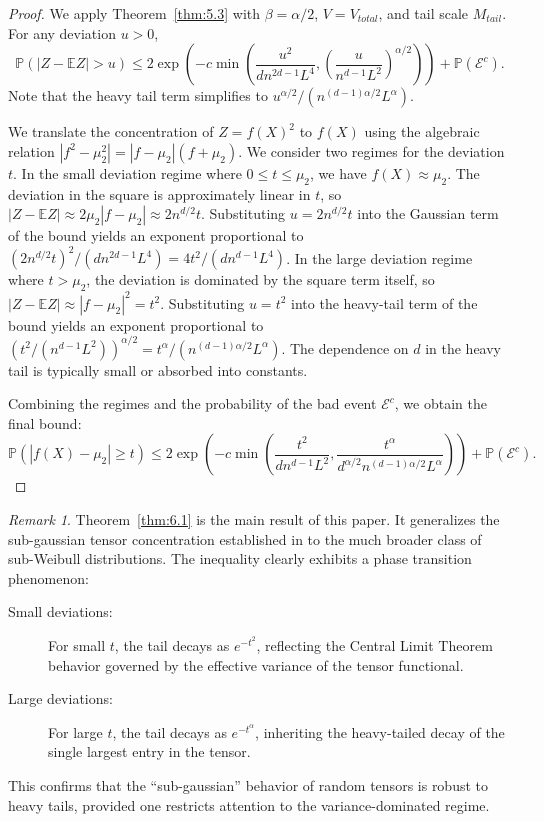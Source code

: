 \documentclass[11pt]{amsart}
\theoremstyle{definition}
\theoremstyle{remark}
\newtheorem*{remark}{Remark}
\begin{document}
\begin{proof}
We apply Theorem~\ref{thm:5.3} with $\beta = \alpha/2$, $V = V_{total}$, and tail scale $M_{tail}$. For any deviation $u > 0$,
\begin{equation}
\mathbb{P}(|Z - \mathbb{E}Z| > u) \le 2 \exp\left( -c \min\left( \frac{u^2}{d n^{2d-1} L^4}, \left( \frac{u}{n^{d-1} L^2} \right)^{\alpha/2} \right) \right) + \mathbb{P}(\mathcal{E}^c).
\end{equation}
Note that the heavy tail term simplifies to $u^{\alpha/2} / (n^{(d-1)\alpha/2} L^\alpha)$.

We translate the concentration of $Z = f(X)^2$ to $f(X)$ using the algebraic relation $|f^2 - \mu_2^2| = |f - \mu_2|(f + \mu_2)$. We consider two regimes for the deviation $t$. In the small deviation regime where $0 \le t \le \mu_2$, we have $f(X) \approx \mu_2$. The deviation in the square is approximately linear in $t$, so $|Z - \mathbb{E}Z| \approx 2\mu_2 |f - \mu_2| \approx 2 n^{d/2} t$. Substituting $u = 2 n^{d/2} t$ into the Gaussian term of the bound yields an exponent proportional to $(2 n^{d/2} t)^2 / (d n^{2d-1} L^4) = 4 t^2 / (d n^{d-1} L^4)$. In the large deviation regime where $t > \mu_2$, the deviation is dominated by the square term itself, so $|Z - \mathbb{E}Z| \approx |f - \mu_2|^2 = t^2$. Substituting $u = t^2$ into the heavy-tail term of the bound yields an exponent proportional to $(t^2 / (n^{d-1} L^2))^{\alpha/2} = t^\alpha / (n^{(d-1)\alpha/2} L^\alpha)$. The dependence on $d$ in the heavy tail is typically small or absorbed into constants.

Combining the regimes and the probability of the bad event $\mathcal{E}^c$, we obtain the final bound:
\begin{equation}
\mathbb{P}\left( |f(X) - \mu_2| \ge t \right) \le 2 \exp\left( -c \min\left( \frac{t^2}{d n^{d-1} L^2}, \frac{t^\alpha}{d^{\alpha/2} n^{(d-1)\alpha/2} L^\alpha} \right) \right) + \mathbb{P}(\mathcal{E}^c).
\end{equation}
\end{proof}

\begin{remark}
Theorem~\ref{thm:6.1} is the main result of this paper. It generalizes the sub-gaussian tensor concentration established in \cite{Vershynin2020} to the much broader class of sub-Weibull distributions. The inequality clearly exhibits a phase transition phenomenon:
\begin{description}
    \item[Small deviations:] For small $t$, the tail decays as $e^{-t^2}$, reflecting the Central Limit Theorem behavior governed by the effective variance of the tensor functional.
    \item[Large deviations:] For large $t$, the tail decays as $e^{-t^\alpha}$, inheriting the heavy-tailed decay of the single largest entry in the tensor.
\end{description}
This confirms that the ``sub-gaussian'' behavior of random tensors is robust to heavy tails, provided one restricts attention to the variance-dominated regime.
\end{remark}
\end{document}
